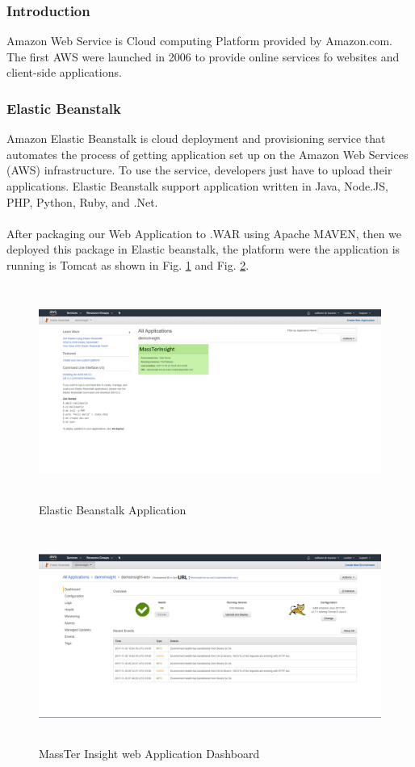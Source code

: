\subsubsection{Introduction}
Amazon Web Service is Cloud computing Platform provided by Amazon.com. The first AWS were launched in 2006 to provide online services fo websites and client-side applications.

\subsubsection{Elastic Beanstalk}
Amazon Elastic Beanstalk is cloud deployment and provisioning service that automates the process of getting application set up on the Amazon Web Services (AWS) infrastructure. To use the service, developers just have to upload their applications. Elastic Beanstalk support application written in Java, Node.JS, PHP, Python, Ruby, and .Net.
\\
\\
After packaging our Web Application to .WAR using Apache MAVEN, then we deployed this package in Elastic beanstalk, the platform were the application is running is Tomcat as shown in Fig. \ref{ElasticBeanstalkApplication} and Fig. \ref{massTerInsightDashboard}.

\begin{figure}[!h]
	\centering
	\includegraphics[width=17cm,height=7cm]{ElasticBeanstalkApplication.png}
	\caption{Elastic Beanstalk Application}
	\label{ElasticBeanstalkApplication}
\end{figure}

\clearpage
\newpage 
\begin{figure}[!h]
	\centering
	\includegraphics[width=17cm,height=7cm]{massTerInsightDashboard.png}
	\caption{MassTer Insight web Application Dashboard}
	\label{massTerInsightDashboard}	
\end{figure}

